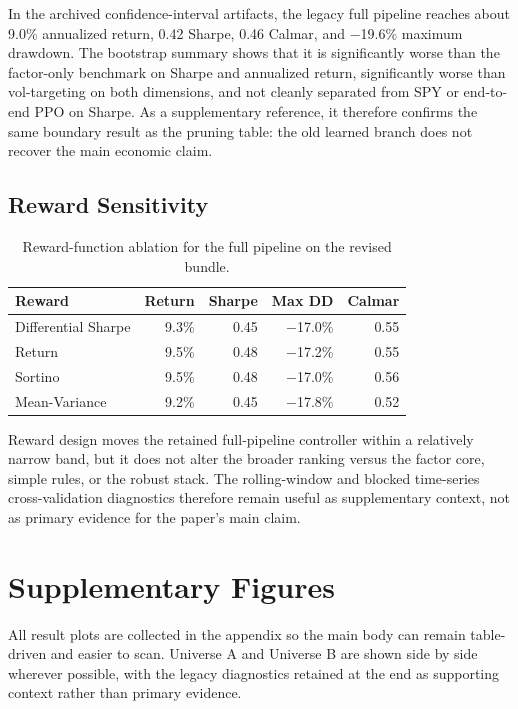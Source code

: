 \documentclass[10pt,twocolumn]{article}
\begin{document}
In the archived confidence-interval artifacts, the legacy full pipeline reaches
about 9.0\% annualized return, 0.42 Sharpe, 0.46 Calmar, and $-$19.6\%
maximum drawdown. The bootstrap summary shows that it is significantly worse
than the factor-only benchmark on Sharpe and annualized return, significantly
worse than vol-targeting on both dimensions, and not cleanly separated from
SPY or end-to-end PPO on Sharpe. As a supplementary reference, it therefore
confirms the same boundary result as the pruning table: the old learned branch
does not recover the main economic claim.

\subsection{Reward Sensitivity}

\begin{table}[t]
\centering
\small
\caption{Reward-function ablation for the full pipeline on the revised bundle.}
\label{tab:reward_ablation}
\begin{tabular}{@{} l r r r r @{}}
\toprule
\textbf{Reward} & \textbf{Return} & \textbf{Sharpe} & \textbf{Max DD} & \textbf{Calmar} \\
\midrule
Differential Sharpe & 9.3\% & 0.45 & $-$17.0\% & 0.55 \\
Return              & 9.5\% & 0.48 & $-$17.2\% & 0.55 \\
Sortino             & 9.5\% & 0.48 & $-$17.0\% & 0.56 \\
Mean-Variance       & 9.2\% & 0.45 & $-$17.8\% & 0.52 \\
\bottomrule
\end{tabular}
\end{table}

Reward design moves the retained full-pipeline controller within a relatively
narrow band, but it does not alter the broader ranking versus the factor core,
simple rules, or the robust stack. The rolling-window and blocked time-series
cross-validation diagnostics therefore remain useful as supplementary context,
not as primary evidence for the paper's main claim.

\section{Supplementary Figures}

All result plots are collected in the appendix so the main body can remain
table-driven and easier to scan. Universe A and Universe B are shown side by
side wherever possible, with the legacy diagnostics retained at the end as
supporting context rather than primary evidence.
\end{document}
